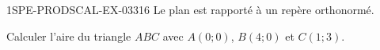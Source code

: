 \begin{exercice}{1SPE-PRODSCAL-EX-033}{1}{6}
Le plan est rapporté à un repère orthonormé.

Calculer l'aire du triangle $ABC$ avec $A(0; 0)$, $B(4; 0)$ et $C(1; 3)$.
\end{exercice}

